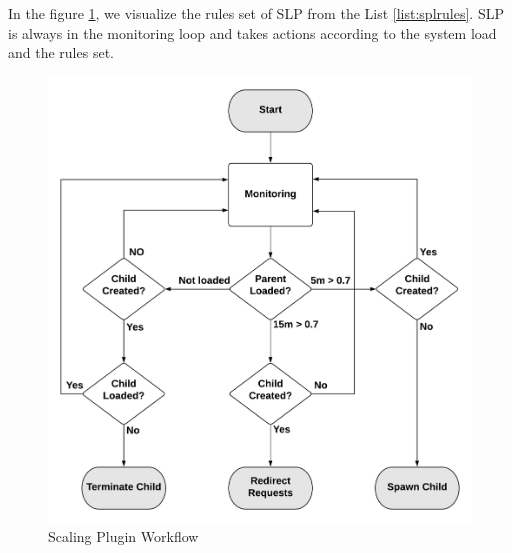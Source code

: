In the figure \ref{fig:splworkflow}, we visualize the rules set of SLP from the List \ref{list:splrules}. SLP is always in the monitoring loop and takes actions according to the system load and the rules set. 

\begin{figure}[h]
	\centering
	\includegraphics[width=1\linewidth]{figures/SPLWorkflow}
	\caption{Scaling Plugin Workflow}
	\label{fig:splworkflow}
\end{figure}

